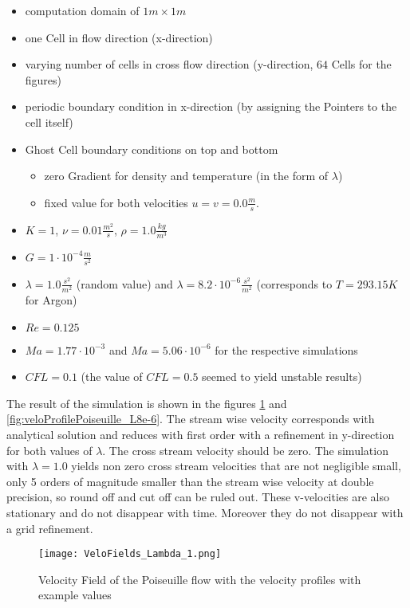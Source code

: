 \documentclass[
	pdftex,             %
	12pt,				%
	a4paper,		   	%
	english,				%
	oneside,			%
]{article}
\begin{document}
\begin{itemize}
\item computation domain of $1m \times 1m$
\item one Cell in flow direction (x-direction)
\item varying number of cells in cross flow direction (y-direction, $64$ Cells for the figures)
\item periodic boundary condition in x-direction (by assigning the Pointers to the cell itself)
\item Ghost Cell boundary conditions on top and bottom
	\begin{itemize}
	\item zero Gradient for density and temperature (in the form of $\lambda$)
	\item fixed value for both velocities $u = v = 0.0 \frac{m}{s}$.
	\end{itemize}
\item $K = 1$, $\nu = 0.01 \frac{m^2}{s}$, $\rho = 1.0 \tfrac{kg}{m^3}$
\item $G = 1\cdot 10^{-4} \frac{m}{s^2}$
\item $\lambda = 1.0 \tfrac{s^2}{m^2}$ (random value) and $\lambda = 8.2 \cdot 10^{-6}  \tfrac{s^2}{m^2}$ (corresponds to $T = 293.15 K$ for Argon)
\item $Re = 0.125$
\item $Ma = 1.77 \cdot 10^{-3}$ and $Ma = 5.06 \cdot 10^{-6}$ for the respective simulations
\item $CFL = 0.1$ (the value of $CFL = 0.5$ seemed to yield unstable results)
\end{itemize}

The result of the simulation is shown in the figures \ref{fig:veloProfilePoiseuille_L1} and \ref{fig:veloProfilePoiseuille_L8e-6}. The stream wise velocity corresponds with analytical solution and reduces with first order with a refinement in y-direction for both values of $\lambda$. The cross stream velocity should be zero. The simulation with $\lambda = 1.0$ yields non zero cross stream velocities that are not negligible small, only 5 orders of magnitude smaller than the stream wise velocity at double precision, so round off and cut off can be ruled out. These v-velocities are also stationary and do not disappear with time. Moreover they do not disappear with a grid refinement.

\begin{figure}
\texttt{[image: VeloFields\_Lambda\_1.png]}
\caption{Velocity Field of the Poiseuille flow with the velocity profiles with example values}
\label{fig:veloProfilePoiseuille_L1}
\end{figure}
\end{document}
